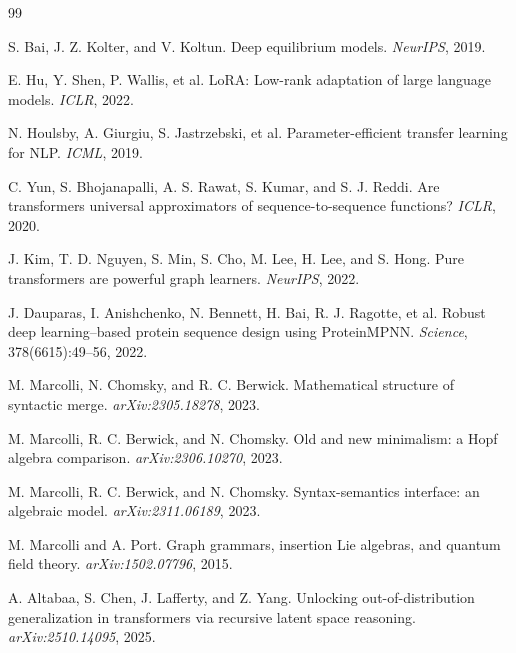 \documentclass[11pt]{article}
\theoremstyle{definition}
\theoremstyle{plain}
\theoremstyle{remark}
\begin{document}
\begin{thebibliography}{99}

S. Bai, J. Z. Kolter, and V. Koltun.
\newblock Deep equilibrium models.
\newblock \emph{NeurIPS}, 2019.

E. Hu, Y. Shen, P. Wallis, et al.
\newblock LoRA: Low-rank adaptation of large language models.
\newblock \emph{ICLR}, 2022.

N. Houlsby, A. Giurgiu, S. Jastrzebski, et al.
\newblock Parameter-efficient transfer learning for NLP.
\newblock \emph{ICML}, 2019.

C. Yun, S. Bhojanapalli, A. S. Rawat, S. Kumar, and S. J. Reddi.
\newblock Are transformers universal approximators of sequence-to-sequence functions?
\newblock \emph{ICLR}, 2020.

J. Kim, T. D. Nguyen, S. Min, S. Cho, M. Lee, H. Lee, and S. Hong.
\newblock Pure transformers are powerful graph learners.
\newblock \emph{NeurIPS}, 2022.

J. Dauparas, I. Anishchenko, N. Bennett, H. Bai, R. J. Ragotte, et al.
\newblock Robust deep learning--based protein sequence design using {ProteinMPNN}.
\newblock \emph{Science}, 378(6615):49--56, 2022.

M. Marcolli, N. Chomsky, and R. C. Berwick.
\newblock Mathematical structure of syntactic merge.
\newblock \emph{arXiv:2305.18278}, 2023.

M. Marcolli, R. C. Berwick, and N. Chomsky.
\newblock Old and new minimalism: a {Hopf} algebra comparison.
\newblock \emph{arXiv:2306.10270}, 2023.

M. Marcolli, R. C. Berwick, and N. Chomsky.
\newblock Syntax-semantics interface: an algebraic model.
\newblock \emph{arXiv:2311.06189}, 2023.

M. Marcolli and A. Port.
\newblock Graph grammars, insertion Lie algebras, and quantum field theory.
\newblock \emph{arXiv:1502.07796}, 2015.

A. Altabaa, S. Chen, J. Lafferty, and Z. Yang.
\newblock Unlocking out-of-distribution generalization in transformers via recursive latent space reasoning.
\newblock \emph{arXiv:2510.14095}, 2025.


\end{thebibliography}
\end{document}
